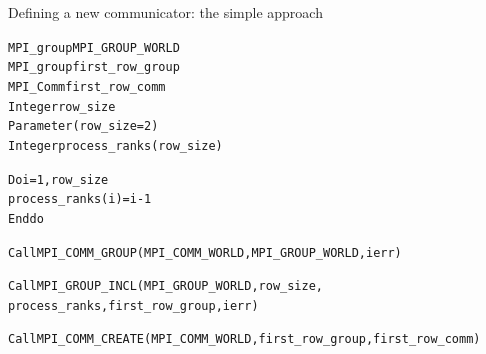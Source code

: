 \documentclass[aspectratio=43]{beamer}
\begin{document}
\begin{frame}[fragile]{Defining a new communicator: the simple approach}
\footnotesize
\begin{alltt}
MPI_group MPI_GROUP_WORLD
MPI_group first_row_group
MPI_Comm first_row_comm
Integer row_size
Parameter(row_size=2)
Integer process_ranks(row_size)

Do i = 1, row_size
   process_ranks(i) = i-1
Enddo

Call MPI_COMM_GROUP(MPI_COMM_WORLD, {\color{cscsred}MPI_GROUP_WORLD}, ierr)

Call MPI_GROUP_INCL(MPI_GROUP_WORLD, row_size,
                    process_ranks, {\color{cscsred}first_row_group}, ierr)

Call MPI_COMM_CREATE(MPI_COMM_WORLD, first_row_group, {\color{cscsred}first_row_comm})
\end{alltt}
\end{frame}
\end{document}
